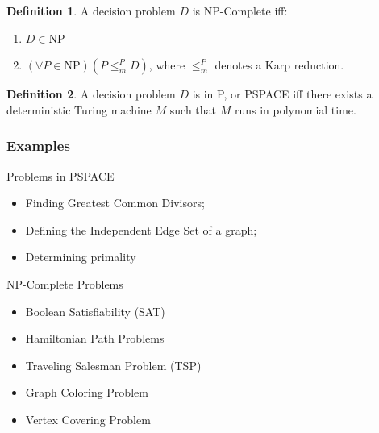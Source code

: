 \documentclass[11pt,letterpaper]{article}
\theoremstyle{definition}
\newtheorem{defn}{Definition}[section]
\begin{document}
\begin{defn}
    A decision problem \(D\) is NP-Complete iff:
    \begin{enumerate}
        \item \(D\in\text{NP}\)
        \item \((\forall P\in\text{NP})(P\leq_m^P D)\), where \(\leq_m^P\) denotes a Karp reduction\autocite{karp_1972}.\autocite{cook_1971}
    \end{enumerate}
\end{defn}

\begin{defn}
    A decision problem \(D\) is in P, or PSPACE iff there exists a deterministic Turing machine \(M\) such that \(M\) runs in polynomial time.\autocite{leeuwen_1994}
\end{defn}
\newpage
\subsubsection{Examples}
\begin{multicols}{2}
    Problems in PSPACE
    \begin{itemize}
            \item Finding Greatest Common Divisors;
            \item Defining the Independent Edge Set of a graph;
            \item Determining primality
    \end{itemize}
    \columnbreak
    NP-Complete Problems
    \begin{itemize}
        \item Boolean Satisfiability (SAT)
        \item Hamiltonian Path Problems
        \item Traveling Salesman Problem (TSP)
        \item Graph Coloring Problem
        \item Vertex Covering Problem
    \end{itemize}
\end{multicols}
\end{document}
